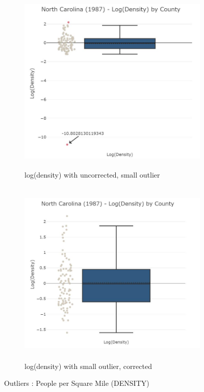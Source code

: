 \vspace*{0.5in}
\begin{figure}[!ht]
	\begin{subfigure}[t]{0.5\textwidth}
		\centering
		\includegraphics[width=\linewidth,height=3.5in]{images/EDA_density_uncorrected.jpg}
		\caption{log(density) with uncorrected, small outlier}
		\label{fig:EDA DENSITY variable uncorrected}
	\end{subfigure}
	\hfill
	\begin{subfigure}[t]{0.5\textwidth}
		\centering
		\includegraphics[width=\linewidth,height=3.5in]{images/EDA_density_corrected.jpg}
		\caption{log(density) with small outlier, corrected}
		\label{fig:EDA DENSITY variable corrected}
	\end{subfigure}
	\label{fig:EDA DENSITY Outlier Untreaded and Treated}
	\caption{Outliers : People per Square Mile (DENSITY)}
\end{figure}

